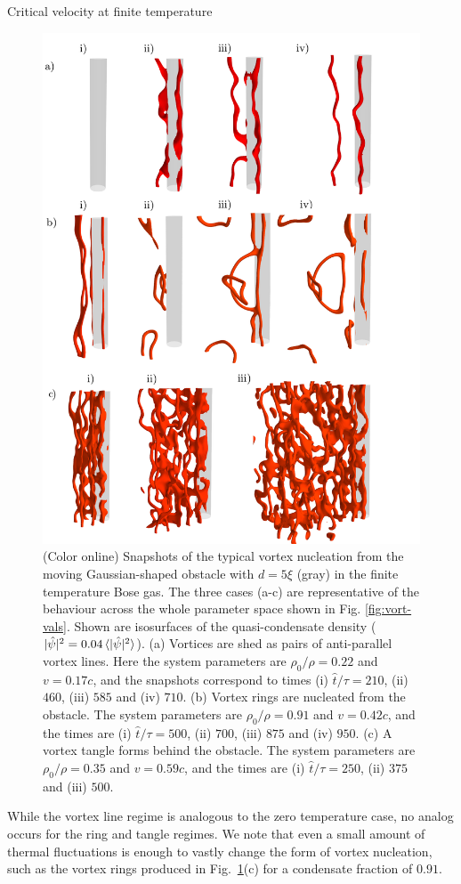 \begin{chapter}{\label{cha:nonequib}Critical velocity at finite temperature}
\begin{figure}
  \centering
    \includegraphics[width=0.6\linewidth]{nonequib/figures/vort}
    \caption{\label{fig:vort-lines}(Color online) Snapshots of the typical vortex nucleation from the moving Gaussian-shaped obstacle with $d=5\xi$ (gray) in the finite temperature Bose gas. The three cases (a-c) are representative of the behaviour across the whole parameter space shown in Fig. \ref{fig:vort-vals}. Shown are  isosurfaces of the quasi-condensate density ($|\hat{\psi}|^2 = 0.04\braket{|\hat{\psi}|^2}$).  (a) Vortices are shed as pairs of anti-parallel vortex lines.  Here the system parameters are $\rho_0/\rho = 0.22$ and $v=0.17c$, and the snapshots correspond to times (i) $\hat{t}/\tau=210$, (ii) $460$, (iii) $585$ and (iv) $710$.  (b) Vortex rings are nucleated from the obstacle.  The system parameters are $\rho_0/\rho = 0.91$ and $v=0.42c$, and the times are (i) $\hat{t}/\tau=500$, (ii) $700$, (iii) $875$ and (iv) $950$. (c) A vortex tangle forms behind the obstacle. The system parameters are $\rho_0/\rho = 0.35$ and $v=0.59c$, and the times are (i) $\hat{t}/\tau=250$, (ii) $375$ and (iii) $500$. }
\end{figure}

While the vortex line regime is analogous to the zero temperature case, no analog occurs for the ring and tangle regimes.   We note that even a small amount of thermal fluctuations is enough to vastly change the form of vortex nucleation, such as the vortex rings produced in Fig.~\ref{fig:vort-lines}(c) for a condensate fraction of $0.91$.


\end{chapter}
